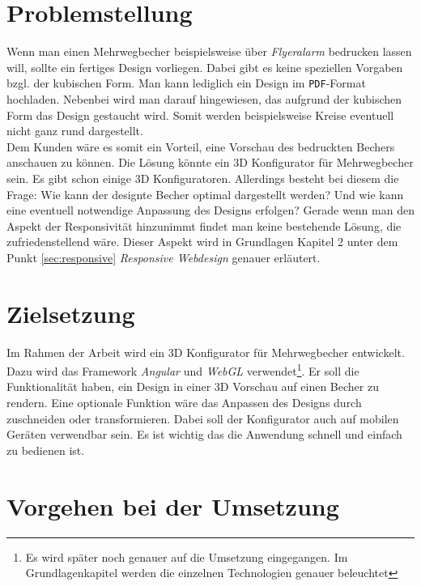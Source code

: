 \section{Problemstellung}
\label{sec:problemstellung}
%
Wenn man einen Mehrwegbecher beispielsweise über \textit{Flyeralarm} bedrucken lassen will, sollte ein fertiges Design vorliegen. Dabei gibt es keine speziellen Vorgaben bzgl. der kubischen Form. Man kann lediglich ein Design im \texttt{PDF}-Format hochladen. Nebenbei wird man darauf hingewiesen, das aufgrund der kubischen Form das Design gestaucht wird. Somit werden beispielsweise Kreise eventuell nicht ganz rund dargestellt. \\ 
%
Dem Kunden wäre es somit ein Vorteil, eine Vorschau des bedruckten Bechers anschauen zu können. Die Lösung könnte ein 3D Konfigurator für Mehrwegbecher sein. Es gibt schon einige 3D Konfiguratoren. Allerdings besteht bei diesem die Frage: Wie kann der designte Becher optimal dargestellt werden? Und wie kann eine eventuell notwendige Anpassung des Designs erfolgen? Gerade wenn man den Aspekt der Responsivität hinzunimmt findet man keine bestehende Lösung, die zufriedenstellend wäre. Dieser Aspekt wird in Grundlagen Kapitel 2 unter dem Punkt \ref{sec:responsive} \textit{Responsive Webdesign} genauer erläutert.
%
%
%
%
%
\section{Zielsetzung}
\label{sec:zielsetzung}
%
Im Rahmen der Arbeit wird ein 3D Konfigurator für Mehrwegbecher entwickelt. Dazu wird das Framework \textit{Angular} und \textit{WebGL} verwendet\footnote{Es wird später noch genauer auf die Umsetzung eingegangen. Im Grundlagenkapitel werden die einzelnen Technologien genauer beleuchtet}. Er soll die Funktionalität haben, ein Design in einer 3D Vorschau auf einen Becher zu rendern. Eine optionale Funktion wäre das Anpassen des Designs durch zuschneiden oder transformieren. Dabei soll der Konfigurator auch auf mobilen Geräten verwendbar sein. Es ist wichtig das die Anwendung schnell und einfach zu bedienen ist.
%
%
%
%
%
%
\section{Vorgehen bei der Umsetzung}
\label{sec:vorgehen}
%
